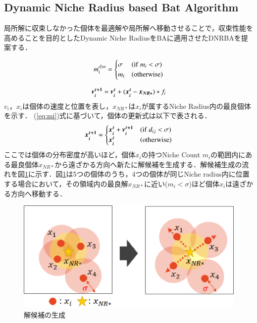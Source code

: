 \documentclass[twocolumn, a4paper]{UECIEresume}
\begin{document}
\subsection{Dynamic Niche Radius based Bat Algorithm}
局所解に収束しなかった個体を最適解や局所解へ移動させることで，収束性能を高めることを目的としたDynamic Niche RadiusをBAに適用させたDNRBAを提案する．

\begin{equation}
\label{eq:mi}
m_i^{dyn}=\begin{cases}
\sigma & ({\rm if } \ m_i < \sigma) \\
m_i & ({\rm otherwise})
\end{cases}
\end{equation}

\begin{equation}
\label{eq:dnrba-vi}
 \mbox{\boldmath $v_i^{t+1}$} = \mbox{\boldmath $v_i^t$} + (\mbox{\boldmath $x_i^t$}-\mbox{\boldmath $x_{NR*}$})*f_i
\end{equation}
$v_i$，$x_i$は個体の速度と位置を表し，$x_{NR*}$は$x_i$が属するNiche Radius内の最良個体を示す．
(\ref{eq:mi})式に基づいて，個体の更新式は以下で表される．
\begin{equation}
\label{eq:dnrba-xi}
\mbox{\boldmath $x_i^{t+1}$}=\begin{cases}
\mbox{\boldmath $x_i^t$}+\mbox{\boldmath $v_i^{t+1}$} & ({\rm if} \ d_{ij} < \sigma) \\
\mbox{\boldmath $x_i^t$} & ({\rm otherwise})
\end{cases}
\end{equation}
ここでは個体の分布密度が高いほど，個体$x_i$の持つNiche Count $m_i$の範囲内にある最良個体$x_{NR*}$から遠ざかる方向へ新たに解候補を生成する．解候補生成の流れを図\ref{fig:nr}に示す．図\ref{fig:nr}は5つの個体のうち，4つの個体が同じNiche radius内に位置する場合において，その領域内の最良解$x_{NR*}$に近い($m_i < \sigma$)ほど個体$x_i$は遠ざかる方向へ移動する．

\begin{figure}[h]
  \centering
  \includegraphics[width=1.0\linewidth]{eps/nr.eps}
  \caption{解候補の生成}
  \label{fig:nr}
\end{figure}
\end{document}
